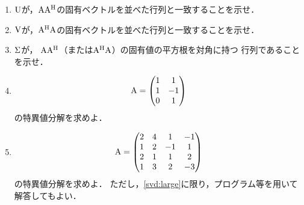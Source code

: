   \begin{enumerate}[label=(\roman*)]
    \item $\mathrm{U}$が，$\mathrm{A}\mathrm{A}^\mathrm{H}$の固有ベクトルを並べた行列と一致することを示せ．
    \item $\mathrm{V}$が，$\mathrm{A}^\mathrm{H}\mathrm{A}$の固有ベクトルを並べた行列と一致することを示せ．
    \item $\mathrm{\Sigma}$が，
      $\mathrm{A}\mathrm{A}^\mathrm{H}$（または$\mathrm{A}^\mathrm{H}\mathrm{A}$）の固有値の平方根を対角に持つ
      行列であることを示せ．
    \item
      \begin{equation}
        \mathrm{A} =
          \begin{pmatrix}
            1 & 1 \\
            1 & -1 \\
            0 & 1
          \end{pmatrix}
      \end{equation}
      の特異値分解を求めよ．
    \item \label{svd:large}
      \begin{equation}
        \mathrm{A} =
          \begin{pmatrix}
            2 & 4 & 1 &-1 \\
            1 & 2 & -1 & 1 \\
            2 & 1 & 1 & 2 \\
            1 & 3 & 2 & -3
          \end{pmatrix}
      \end{equation}の特異値分解を求めよ．
      ただし，\ref{svd:large}に限り，プログラム等を用いて解答してもよい．
  \end{enumerate}

